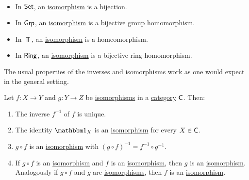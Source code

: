 \documentclass[../../main]{subfiles}
\begin{document}
\begin{example}~
  \begin{itemize}
    \item In \(\mathsf{Set}\), an \hyperref[def:categorical-isomorphism]{isomorphism} is a bijection.
    \item In \(\mathsf{Grp}\), an \hyperref[def:categorical-isomorphism]{isomorphism} is a bijective group homomorphism.
    \item In \(\Top\), an \hyperref[def:categorical-isomorphism]{isomorphism} is a homeomorphism.
    \item In \(\mathsf{Ring}\), an \hyperref[def:categorical-isomorphism]{isomorphism} is a bijective ring homomorphism.
  \end{itemize}
\end{example}

The usual properties of the inverses and isomorphisms work as one would expect in the general setting.
\begin{proposition}
  Let \(f\colon X \to Y\) and \(g\colon Y \to Z\) be \hyperref[def:categorical-isomorphism]{isomorphisms} in a \hyperref[def:category]{category} \(\mathsf{C}\). Then:
  \begin{enumerate}
    \item The inverse \(f^{-1}\) of \(f\) is unique.
    \item The identity \(\id_X\) is an \hyperref[def:categorical-isomorphism]{isomorphism} for every \(X \in \mathsf{C}\).
    \item \(g \circ f\) is an \hyperref[def:categorical-isomorphism]{isomorphism} with \((g \circ f)^{-1} = f^{-1} \circ g^{-1}\).
    \item If \(g \circ f\) is an \hyperref[def:categorical-isomorphism]{isomorphism} and \(f\) is an \hyperref[def:categorical-isomorphism]{isomorphism}, then \(g\) is an \hyperref[def:categorical-isomorphism]{isomorphism}. Analogously if \(g \circ f\) and \(g\) are \hyperref[def:categorical-isomorphism]{isomorphisms}, then \(f\) is an \hyperref[def:categorical-isomorphism]{isomorphism}.
  \end{enumerate}
\end{proposition}
\end{document}
